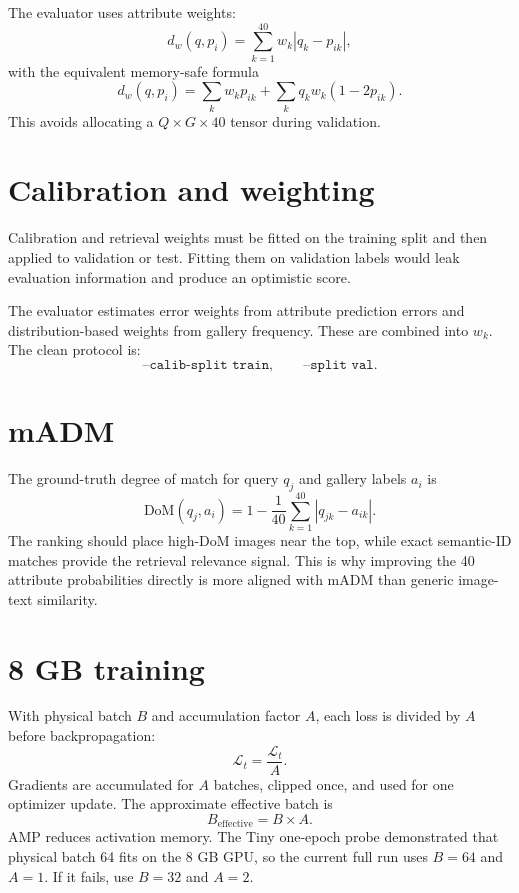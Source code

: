 \documentclass[11pt]{article}
\begin{document}
The evaluator uses attribute weights:
\[
d_w(q,p_i)=\sum_{k=1}^{40}w_k|q_k-p_{ik}|,
\]
with the equivalent memory-safe formula
\[
d_w(q,p_i)=\sum_kw_kp_{ik}+\sum_kq_kw_k(1-2p_{ik}).
\]
This avoids allocating a $Q\times G\times40$ tensor during validation.

\section{Calibration and weighting}
Calibration and retrieval weights must be fitted on the training split and then applied to validation or test. Fitting them on validation labels would leak evaluation information and produce an optimistic score.

The evaluator estimates error weights from attribute prediction errors and distribution-based weights from gallery frequency. These are combined into $w_k$. The clean protocol is:
\[
\texttt{--calib-split train},\qquad\texttt{--split val}.
\]

\section{mADM}
The ground-truth degree of match for query $q_j$ and gallery labels $a_i$ is
\[
\mathrm{DoM}(q_j,a_i)=1-\frac{1}{40}\sum_{k=1}^{40}|q_{jk}-a_{ik}|.
\]
The ranking should place high-DoM images near the top, while exact semantic-ID matches provide the retrieval relevance signal. This is why improving the 40 attribute probabilities directly is more aligned with mADM than generic image-text similarity.

\section{8 GB training}
With physical batch $B$ and accumulation factor $A$, each loss is divided by $A$ before backpropagation:
\[
\widehat{\mathcal{L}}_t=\frac{\mathcal{L}_t}{A}.
\]
Gradients are accumulated for $A$ batches, clipped once, and used for one optimizer update. The approximate effective batch is
\[
B_{\mathrm{effective}}=B\times A.
\]
AMP reduces activation memory. The Tiny one-epoch probe demonstrated that physical batch 64 fits on the 8 GB GPU, so the current full run uses $B=64$ and $A=1$. If it fails, use $B=32$ and $A=2$.
\end{document}
